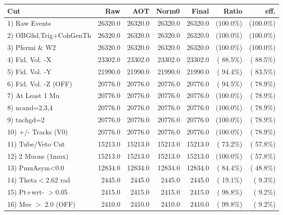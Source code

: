  \begin{table}[h!]\centering
 \begin{tabular}{||l||r|r|r|r|r|r||}
 \hline
 \hline
 Cut & Raw & AOT & Norm0 & Final & Ratio & eff.       \\
 \hline
  1) Raw Events           &      26320.0 &      26320.0 &      26320.0 &      26320.0 & (100.0\%) & (100.0\%) \\
  2) OBGfid,Trig+CohGenTh &      26320.0 &      26320.0 &      26320.0 &      26320.0 & (100.0\%) & (100.0\%) \\
  3) Pfermi \& W2         &      26320.0 &      26320.0 &      26320.0 &      26320.0 & (100.0\%) & (100.0\%) \\
  4) Fid. Vol. -X         &      23302.0 &      23302.0 &      23302.0 &      23302.0 & ( 88.5\%) & ( 88.5\%) \\
  5) Fid. Vol. -Y         &      21990.0 &      21990.0 &      21990.0 &      21990.0 & ( 94.4\%) & ( 83.5\%) \\
  6) Fid. Vol. -Z (OFF)   &      20776.0 &      20776.0 &      20776.0 &      20776.0 & ( 94.5\%) & ( 78.9\%) \\
  7) At Least 1 Mu        &      20776.0 &      20776.0 &      20776.0 &      20776.0 & (100.0\%) & ( 78.9\%) \\
  8) ncand=2,3,4          &      20776.0 &      20776.0 &      20776.0 &      20776.0 & (100.0\%) & ( 78.9\%) \\
  9) tnchgd=2             &      20776.0 &      20776.0 &      20776.0 &      20776.0 & (100.0\%) & ( 78.9\%) \\
 10) +/- Tracks (V0)      &      20776.0 &      20776.0 &      20776.0 &      20776.0 & (100.0\%) & ( 78.9\%) \\
 11) Tube/Veto Cut        &      15213.0 &      15213.0 &      15213.0 &      15213.0 & ( 73.2\%) & ( 57.8\%) \\
 12) 2 Muons (1mux)       &      15213.0 &      15213.0 &      15213.0 &      15213.0 & (100.0\%) & ( 57.8\%) \\
 13) PmuAsym<0.0          &      12834.0 &      12834.0 &      12834.0 &      12834.0 & ( 84.4\%) & ( 48.8\%) \\
 14) Theta$<$2.62 rad     &       2445.0 &       2445.0 &       2445.0 &       2445.0 & ( 19.1\%) & (  9.3\%) \\
 15) Pt+wrt- $>$0.05      &       2415.0 &       2415.0 &       2415.0 &       2415.0 & ( 98.8\%) & (  9.2\%) \\
 16) Mee $>$ 2.0  (OFF)   &       2410.0 &       2410.0 &       2410.0 &       2410.0 & ( 99.8\%) & (  9.2\%) \\

\end{tabular}
\end{table}
